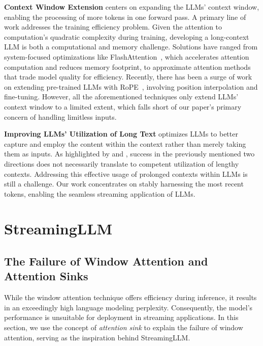 \textbf{Context Window Extension} centers on expanding the LLMs' context window, enabling the processing of more tokens in one forward pass. A primary line of work addresses the training efficiency problem. Given the attention to computation's quadratic complexity during training, developing a long-context LLM is both a computational and memory challenge. Solutions have ranged from system-focused optimizations like FlashAttention~\citep{dao2022flashattention, dao2023flashattention2}, which accelerates attention computation and reduces memory footprint, to approximate attention methods~\citep{zaheer2020bigbird,beltagy2020longformer,wang2020linformer,kitaev2020reformer} that trade model quality for efficiency. Recently, there has been a surge of work on extending pre-trained LLMs with RoPE~\citep{chen2023extending,kaiokendev,blocntkaware,peng2023yarn}, involving position interpolation and fine-tuning. However, all the aforementioned techniques only extend LLMs' context window to a limited extent, which falls short of our paper's primary concern of handling limitless inputs.

\textbf{Improving LLMs' Utilization of Long Text} optimizes LLMs to better capture and employ the content within the context rather than merely taking them as inputs. As highlighted by \citeauthor{liu2023lost} and \citeauthor{longchat2023}, success in the previously mentioned two directions does not necessarily translate to competent utilization of lengthy contexts. Addressing this effective usage of prolonged contexts within LLMs is still a challenge. Our work concentrates on stably harnessing the most recent tokens, enabling the seamless streaming application of LLMs.

\section{StreamingLLM}

\subsection{The Failure of Window Attention and Attention Sinks} While the window attention technique offers efficiency during inference, it results in an exceedingly high language modeling perplexity. Consequently, the model's performance is unsuitable for deployment in streaming applications. In this section, we use the concept of \emph{attention sink} to explain the failure of window attention, serving as the inspiration behind StreamingLLM.

